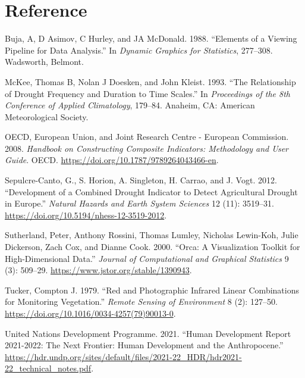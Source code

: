 \documentclass[
]{interact}
\newlength{\cslhangindent}
\newlength{\cslentryspacingunit} %
\newenvironment{CSLReferences}[2] %
 {%
  \setlength{\parindent}{0pt}
  \ifodd #1
  \let\oldpar\par
  \def\par{\hangindent=\cslhangindent\oldpar}
  \fi
  \setlength{\parskip}{#2\cslentryspacingunit}
 }%
 {}
\begin{document}
\hypertarget{reference}{%
\section*{Reference}\label{reference}}

\hypertarget{refs}{}
\begin{CSLReferences}{1}{0}
\leavevmode{}%
Buja, A, D Asimov, C Hurley, and JA McDonald. 1988. {``Elements of a
Viewing Pipeline for Data Analysis.''} In \emph{Dynamic Graphics for
Statistics}, 277--308. Wadsworth, Belmont.

\leavevmode{}%
McKee, Thomas B, Nolan J Doesken, and John Kleist. 1993. {``The
Relationship of Drought Frequency and Duration to Time Scales.''} In
\emph{Proceedings of the 8th Conference of Applied Climatology},
179--84. Anaheim, CA: American Meteorological Society.

\leavevmode{}%
OECD, European Union, and Joint Research Centre - European Commission.
2008. \emph{Handbook on {Constructing} {Composite} {Indicators}:
{Methodology} and {User} {Guide}}. OECD.
\url{https://doi.org/10.1787/9789264043466-en}.

\leavevmode{}%
Sepulcre-Canto, G., S. Horion, A. Singleton, H. Carrao, and J. Vogt.
2012. {``Development of a {Combined} {Drought} {Indicator} to Detect
Agricultural Drought in {Europe}.''} \emph{Natural Hazards and Earth
System Sciences} 12 (11): 3519--31.
\url{https://doi.org/10.5194/nhess-12-3519-2012}.

\leavevmode{}%
Sutherland, Peter, Anthony Rossini, Thomas Lumley, Nicholas Lewin-Koh,
Julie Dickerson, Zach Cox, and Dianne Cook. 2000. {``Orca: {A}
{Visualization} {Toolkit} for {High}-{Dimensional} {Data}.''}
\emph{Journal of Computational and Graphical Statistics} 9 (3): 509--29.
\url{https://www.jstor.org/stable/1390943}.

\leavevmode{}%
Tucker, Compton J. 1979. {``Red and Photographic Infrared Linear
Combinations for Monitoring Vegetation.''} \emph{Remote Sensing of
Environment} 8 (2): 127--50.
\url{https://doi.org/10.1016/0034-4257(79)90013-0}.

\leavevmode{}%
United Nations Development Programme. 2021. {``Human Development Report
2021-2022: The Next Frontier: Human Development and the Anthropocene.''}
\url{https://hdr.undp.org/sites/default/files/2021-22_HDR/hdr2021-22_technical_notes.pdf}.


\end{CSLReferences}
\end{document}
